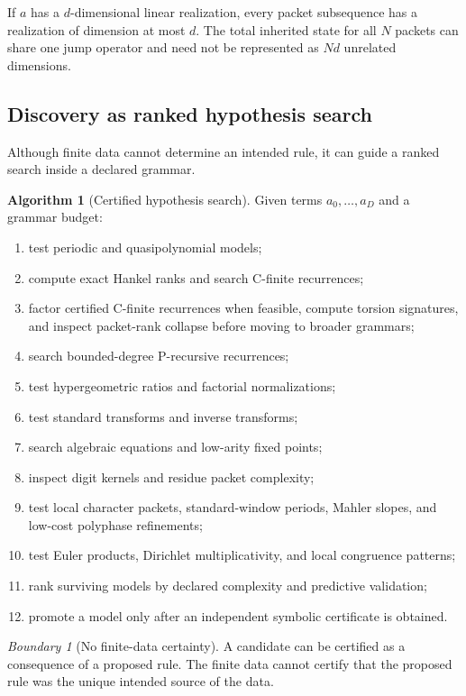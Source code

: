 \documentclass[11pt]{article}
\theoremstyle{definition}\newtheorem{definition}[theorem]{Definition}\newtheorem{example}[theorem]{Example}\newtheorem{construction}[theorem]{Construction}\newtheorem{algorithm}[theorem]{Algorithm}\newtheorem{conjecture}[theorem]{Conjecture}\newtheorem{problem}[theorem]{Problem}
\theoremstyle{remark}\newtheorem{remark}[theorem]{Remark}\newtheorem{boundary}[theorem]{Boundary}\newtheorem{certificate}[theorem]{Computational Certificate}\newtheorem{classical}[theorem]{Classical Input}\newtheorem{principle}[theorem]{Structural Principle}
\begin{document}
\begin{proposition}
If $a$ has a $d$-dimensional linear realization, every packet subsequence has a realization of dimension at most $d$.  The total inherited state for all $N$ packets can share one jump operator and need not be represented as $Nd$ unrelated dimensions.
\end{proposition}

\subsection{Discovery as ranked hypothesis search}
Although finite data cannot determine an intended rule, it can guide a ranked search inside a declared grammar.

\begin{algorithm}[Certified hypothesis search]
Given terms $a_0,\ldots,a_D$ and a grammar budget:
\begin{enumerate}
\item test periodic and quasipolynomial models;
\item compute exact Hankel ranks and search C-finite recurrences;
\item factor certified C-finite recurrences when feasible, compute torsion signatures, and inspect packet-rank collapse before moving to broader grammars;
\item search bounded-degree P-recursive recurrences;
\item test hypergeometric ratios and factorial normalizations;
\item test standard transforms and inverse transforms;
\item search algebraic equations and low-arity fixed points;
\item inspect digit kernels and residue packet complexity;
\item test local character packets, standard-window periods, Mahler slopes, and low-cost polyphase refinements;
\item test Euler products, Dirichlet multiplicativity, and local congruence patterns;
\item rank surviving models by declared complexity and predictive validation;
\item promote a model only after an independent symbolic certificate is obtained.
\end{enumerate}
\end{algorithm}

\begin{boundary}[No finite-data certainty]
A candidate can be certified as a consequence of a proposed rule.  The finite data cannot certify that the proposed rule was the unique intended source of the data.
\end{boundary}
\end{document}
